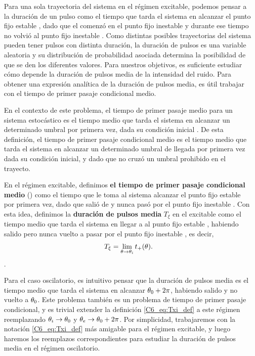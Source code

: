 \documentclass[./main.tex]{subfiles}
\begin{document}
Para una sola trayectoria del sistema en el régimen excitable, podemos pensar a la duración de un pulso como el tiempo que tarda el sistema en alcanzar el punto fijo estable \xxe, dado que el comenzó en el punto fijo inestable \xxi y durante ese tiempo no volvió al punto fijo inestable \xxi. Como distintas posibles trayectorias del sistema pueden tener pulsos con distinta duración, la duración de pulsos es una variable aleatoria y su distribución de probabilidad asociada determina la posibilidad de que se den los diferentes valores. Para nuestros objetivos, es suficiente estudiar cómo depende la duración de pulsos media de la intensidad del ruido. Para obtener una expresión analítica de la duración de pulsos media, es útil trabajar con el tiempo de primer pasaje condicional medio. 


En el contexto de este problema, el tiempo de primer pasaje medio para un sistema estocástico es el tiempo medio que tarda el sistema en alcanzar un determinado umbral por primera vez, dada su condición inicial \cite{Redner2001}. De esta definición, el tiempo de primer pasaje condicional medio es el tiempo medio que tarda el sistema en alcanzar un determinado umbral de llegada por primera vez dada su condición inicial, y dado que no cruzó un umbral prohibido en el trayecto.  

En el régimen excitable, definimos \textbf{el tiempo de primer pasaje condicional medio} \tplus(\xx) como el tiempo que le toma al sistema alcanzar el punto fijo estable \xxe por primera vez, dado que salió de \xx y nunca pasó por el punto fijo inestable \xxi. Con esta idea, definimos la \textbf{duración de pulsos media} $T_\xi$ en el excitable como el tiempo medio que tarda el sistema en llegar a al punto fijo estable \xxe, habiendo salido pero nunca vuelto a pasar por el punto fijo inestable \xxi, es decir,
\begin{align}
    T_\xi = \lim_{\theta \rightarrow \theta_i}t_{+}(\theta).
    \label{C6_eq:Txi_def}
\end{align}.

Para el caso oscilatorio, es intuitivo pensar que la duración de pulsos media es el tiempo medio que tarda el sistema en alcanzar $\theta_0+2\pi$, habiendo salido y no vuelto a $\theta_0$. Este problema también es un problema de tiempo de primer pasaje condicional, y es trivial extender la definición \ref{C6_eq:Txi_def} a este régimen reemplazando $\theta_i \rightarrow \theta_0$ y $\theta_e \rightarrow \theta_0+2\pi$. Por simplicidad, trabajaremos con la notación \ref{C6_eq:Txi_def} más amigable para el régimen excitable, y luego haremos los reemplazos correspondientes para estudiar la duración de pulsos media en el régimen oscilatorio. 
\end{document}

